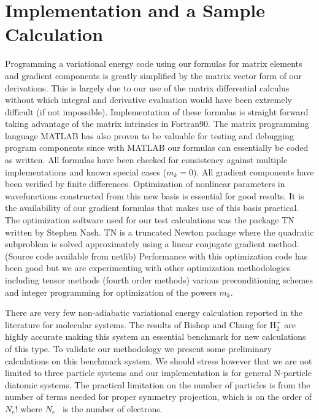 \documentclass[12pt]{article}
\begin{document}
\section{Implementation and a Sample Calculation}

Programming a variational energy code using our formulas for matrix elements
and gradient components is greatly simplified by the matrix vector form of our
derivations. This is largely due to our use of the matrix differential
calculus without which integral and derivative evaluation would have been
extremely difficult (if not impossible). Implementation of these formulas is
straight forward taking advantage of the matrix intrinsics in Fortran90. The
matrix programming language MATLAB\cite{MATLAB} has also proven to be valuable
for testing and debugging program components since with MATLAB our formulas
can essentially be coded as written. All formulas have been checked for
consistency against multiple implementations and known special cases
($m_{k}=0$). All gradient components have been  verified by finite differences.
Optimization of nonlinear parameters in wavefunctions constructed from this
new basis is essential for good results. It is the availability of our
gradient formulas that makes use of this basis practical. The optimization
software used for our test calculations was the package TN written by Stephen
Nash\cite{NashTN}. TN is a truncated Newton package where the quadratic
subproblem is solved approximately using a linear conjugate gradient method.
(Source code available from netlib\cite{netlib})  Performance with this
optimization code has been good but we are experimenting with other
optimization methodologies including tensor methods (fourth order methods)
various preconditioning schemes and integer programming for optimization of
the powers $m_{k}$. 

There are very few non-adiabatic variational energy calculation reported in
the literature for molecular systems. The results of Bishop and
Chung\cite{Bishop77} for H$_{2}^{+}$ are highly accurate making this system an
essential benchmark for new calculations of this type. To validate our
methodology we present some preliminary calculations on this benchmark system.
We should stress however that we are not limited to three particle systems and
our implementation is for general N-particle diatomic systems. The practical
limitation on the number of particles is from the number of terms needed for
proper symmetry projection, which is on the order of $N_{e}!$ where $N_{e}$
\ is the number of electrons.
\end{document}
